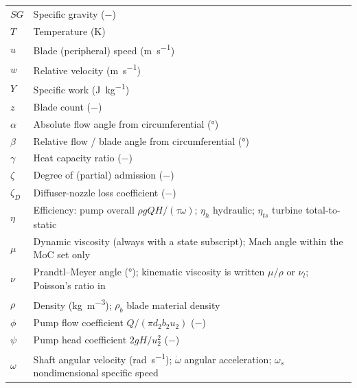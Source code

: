 \begin{tabular}{ll}
  $SG$ & Specific gravity ($-$) \\
  $T$ & Temperature (\si{\kelvin}) \\
  $u$ & Blade (peripheral) speed (\si{\meter\per\second}) \\
  $w$ & Relative velocity (\si{\meter\per\second}) \\
  $Y$ & Specific work (\si{\joule\per\kilogram}) \\
  $z$ & Blade count ($-$) \\
  $\alpha$ & Absolute flow angle from circumferential (\si{\degree}) \\
  $\beta$ & Relative flow / blade angle from circumferential (\si{\degree}) \\
  $\gamma$ & Heat capacity ratio ($-$) \\
  $\zeta$ & Degree of (partial) admission ($-$) \\
  $\zeta_D$ & Diffuser-nozzle loss coefficient ($-$) \\
  $\eta$ & Efficiency: pump overall $\rho g Q H/(\tau\omega)$; $\eta_h$ hydraulic; $\eta_{ts}$ turbine total-to-static \\
  $\mu$ & Dynamic viscosity (always with a state subscript); Mach angle within the MoC set only \\
  $\nu$ & Prandtl--Meyer angle (\si{\degree}); kinematic viscosity is written $\mu/\rho$ or $\nu_l$; Poisson's ratio in \\
  $\rho$ & Density (\si{\kilogram\per\cubic\meter}); $\rho_b$ blade material density \\
  $\phi$ & Pump flow coefficient $Q/(\pi d_2 b_2 u_2)$ ($-$) \\
  $\psi$ & Pump head coefficient $2gH/u_2^2$ ($-$) \\
  $\omega$ & Shaft angular velocity (\si{\radian\per\second}); $\dot\omega$ angular acceleration; $\omega_s$ nondimensional specific speed \\
\end{tabular}
\\[8pt]

